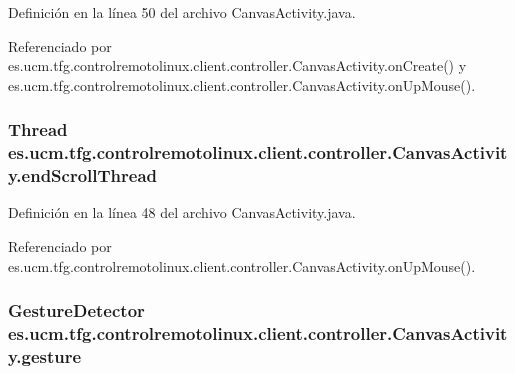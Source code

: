 Definición en la línea 50 del archivo Canvas\-Activity.\-java.



Referenciado por es.\-ucm.\-tfg.\-controlremotolinux.\-client.\-controller.\-Canvas\-Activity.\-on\-Create() y es.\-ucm.\-tfg.\-controlremotolinux.\-client.\-controller.\-Canvas\-Activity.\-on\-Up\-Mouse().

\hypertarget{classes_1_1ucm_1_1tfg_1_1controlremotolinux_1_1client_1_1controller_1_1CanvasActivity_a8dd8485425c6232979b318d0647cc84f}{
\subsubsection[{end\-Scroll\-Thread}]{\setlength{\rightskip}{0pt plus 5cm}Thread es.\-ucm.\-tfg.\-controlremotolinux.\-client.\-controller.\-Canvas\-Activity.\-end\-Scroll\-Thread\hspace{0.3cm}{\ttfamily [private]}}}\label{classes_1_1ucm_1_1tfg_1_1controlremotolinux_1_1client_1_1controller_1_1CanvasActivity_a8dd8485425c6232979b318d0647cc84f}


Definición en la línea 48 del archivo Canvas\-Activity.\-java.



Referenciado por es.\-ucm.\-tfg.\-controlremotolinux.\-client.\-controller.\-Canvas\-Activity.\-on\-Up\-Mouse().

\hypertarget{classes_1_1ucm_1_1tfg_1_1controlremotolinux_1_1client_1_1controller_1_1CanvasActivity_a29bef2fb0df9169e676ed728fb3776f5}{
\subsubsection[{gesture}]{\setlength{\rightskip}{0pt plus 5cm}Gesture\-Detector es.\-ucm.\-tfg.\-controlremotolinux.\-client.\-controller.\-Canvas\-Activity.\-gesture\hspace{0.3cm}{\ttfamily [private]}}}\label{classes_1_1ucm_1_1tfg_1_1controlremotolinux_1_1client_1_1controller_1_1CanvasActivity_a29bef2fb0df9169e676ed728fb3776f5}


